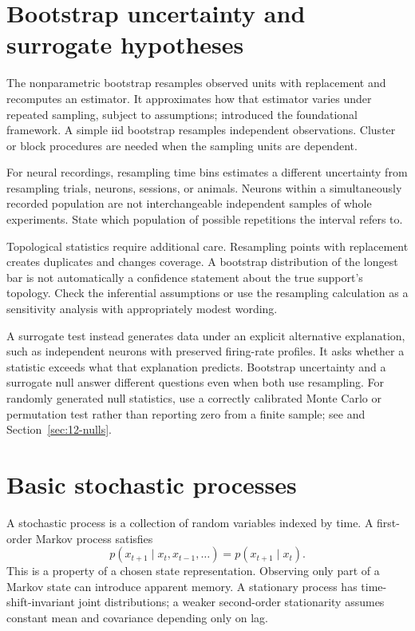 \section{Bootstrap uncertainty and surrogate hypotheses}
The nonparametric bootstrap resamples observed units with replacement and recomputes an estimator. It approximates how that estimator varies under repeated sampling, subject to assumptions; \citet{ev_efron1979} introduced the foundational framework. A simple iid bootstrap resamples independent observations. Cluster or block procedures are needed when the sampling units are dependent.

For neural recordings, resampling time bins estimates a different uncertainty from resampling trials, neurons, sessions, or animals. Neurons within a simultaneously recorded population are not interchangeable independent samples of whole experiments. State which population of possible repetitions the interval refers to.

Topological statistics require additional care. Resampling points with replacement creates duplicates and changes coverage. A bootstrap distribution of the longest bar is not automatically a confidence statement about the true support's topology. Check the inferential assumptions or use the resampling calculation as a sensitivity analysis with appropriately modest wording.

A surrogate test instead generates data under an explicit alternative explanation, such as independent neurons with preserved firing-rate profiles. It asks whether a statistic exceeds what that explanation predicts. Bootstrap uncertainty and a surrogate null answer different questions even when both use resampling. For randomly generated null statistics, use a correctly calibrated Monte Carlo or permutation test rather than reporting zero from a finite sample; see \citet{ev_phipson2010} and Section~\ref{sec:12-nulls}.

\section{Basic stochastic processes}
A stochastic process is a collection of random variables indexed by time. A first-order Markov process satisfies
\[
p(x_{t+1}\mid x_t,x_{t-1},\ldots)=p(x_{t+1}\mid x_t).
\]
This is a property of a chosen state representation. Observing only part of a Markov state can introduce apparent memory. A stationary process has time-shift-invariant joint distributions; a weaker second-order stationarity assumes constant mean and covariance depending only on lag.

